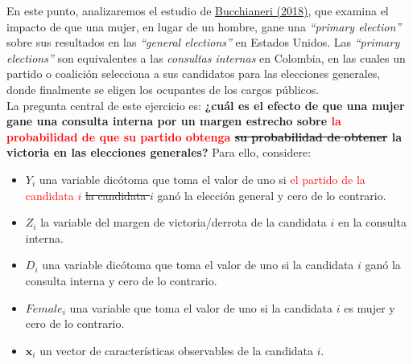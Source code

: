 \documentclass[a4paper, answers, addpoints, 11pt]{exam}
\begin{document}
En este punto, analizaremos el estudio de \href{https://link.springer.com/article/10.1007/s11109-017-9407-7}{Bucchianeri (2018)}, que examina el impacto de que una mujer, en lugar de un hombre, gane una \textit{``primary election''} sobre sus resultados en las \textit{``general elections''} en Estados Unidos. Las \textit{``primary elections''} son equivalentes a las \textit{consultas internas} en Colombia, en las cuales un partido o coalición selecciona a sus candidatos para las elecciones generales, donde finalmente se eligen los ocupantes de los cargos públicos. \\

La pregunta central de este ejercicio es:
\textbf{¿cuál es el efecto de que una mujer gane una consulta interna por un margen estrecho sobre \textcolor{red}{la probabilidad de que su partido obtenga} \sout{ su probabilidad de obtener} la victoria en las elecciones generales?} Para ello, considere: \\

\begin{itemize}
    \item $Y_i$ una variable dicótoma que toma el valor de uno si \textcolor{red}{el partido de la candidata $i$} \sout{ la candidata $i$} ganó la elección general y cero de lo contrario.

    \item $Z_i$ la variable del margen de victoria/derrota de la candidata $i$ en la consulta interna.
    
    \item $D_i$ una variable dicótoma que toma el valor de uno si la candidata $i$ ganó la consulta interna y cero de lo contrario.

    \item $Female_i$ una variable que toma el valor de uno si la candidata $i$ es mujer y cero de lo contrario.

    \item $\textbf{x}_i$ un vector de características observables de la candidata $i$.
\end{itemize}
\end{document}
